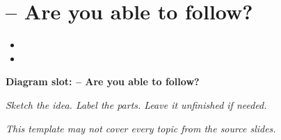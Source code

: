 \documentclass[14pt]{extarticle}
\begin{document}
\section{– Are you able to follow?}
\begin{itemize}[leftmargin=*]
  \item \hrulefill
  \vspace{2.4em}
  \item \hrulefill
  \vspace{2.4em}
\end{itemize}
\noindent\textbf{Diagram slot: – Are you able to follow?}
\begin{framed}
\begin{minipage}[t][0.22\textheight]{\textwidth}
\vspace{0.4em}
\textit{Sketch the idea. Label the parts. Leave it unfinished if needed.}
\end{minipage}
\end{framed}
\vspace{1em}
\vspace{2em}
\begin{center}
\textit{This template may not cover every topic from the source slides.}
\end{center}
\end{document}
